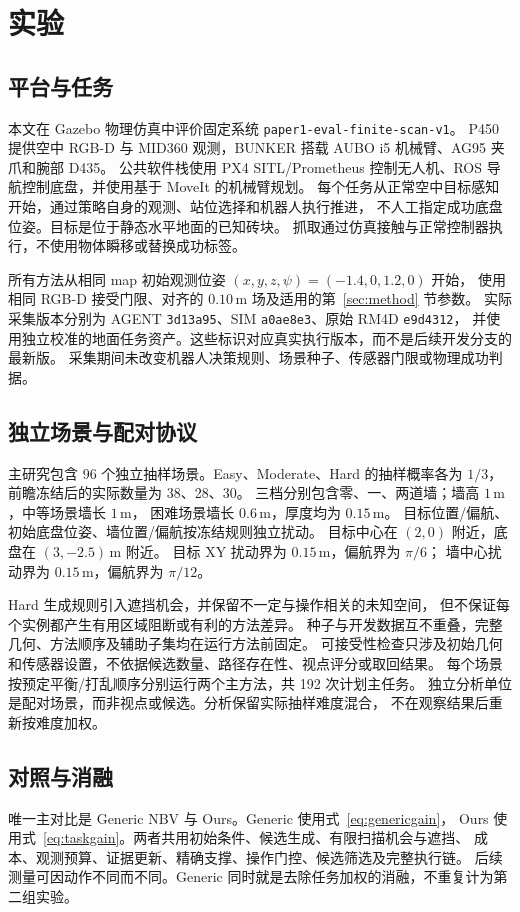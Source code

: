 \section{实验}
\label{sec:experiments}
\subsection{平台与任务}
本文在 Gazebo 物理仿真中评价固定系统 \texttt{paper1-eval-finite-scan-v1}。
P450 提供空中 RGB-D 与 MID360 观测，BUNKER 搭载 AUBO i5 机械臂、AG95 夹爪和腕部 D435。
公共软件栈使用 PX4 SITL/Prometheus 控制无人机、ROS 导航控制底盘，并使用基于 MoveIt 的机械臂规划。
每个任务从正常空中目标感知开始，通过策略自身的观测、站位选择和机器人执行推进，
不人工指定成功底盘位姿。目标是位于静态水平地面的已知砖块。
抓取通过仿真接触与正常控制器执行，不使用物体瞬移或替换成功标签。

所有方法从相同 map 初始观测位姿 $(x,y,z,\psi)=(-1.4,0,1.2,0)$ 开始，
使用相同 RGB-D 接受门限、对齐的 $0.10\,\mathrm{m}$ 场及适用的第~\ref{sec:method} 节参数。
实际采集版本分别为 AGENT \texttt{3d13a95}、SIM \texttt{a0ae8e3}、原始 RM4D \texttt{e9d4312}，
并使用独立校准的地面任务资产。这些标识对应真实执行版本，而不是后续开发分支的最新版。
采集期间未改变机器人决策规则、场景种子、传感器门限或物理成功判据。

\subsection{独立场景与配对协议}
\label{sec:scenes}
主研究包含 96 个独立抽样场景。Easy、Moderate、Hard 的抽样概率各为 $1/3$，
前瞻冻结后的实际数量为 38、28、30。
三档分别包含零、一、两道墙；墙高 $1\,\mathrm{m}$，中等场景墙长 $1\,\mathrm{m}$，
困难场景墙长 $0.6\,\mathrm{m}$，厚度均为 $0.15\,\mathrm{m}$。
目标位置/偏航、初始底盘位姿、墙位置/偏航按冻结规则独立扰动。
目标中心在 $(2,0)$ 附近，底盘在 $(3,-2.5)\,\mathrm{m}$ 附近。
目标 XY 扰动界为 $0.15\,\mathrm{m}$，偏航界为 $\pi/6$；
墙中心扰动界为 $0.15\,\mathrm{m}$，偏航界为 $\pi/12$。

Hard 生成规则引入遮挡机会，并保留不一定与操作相关的未知空间，
但不保证每个实例都产生有用区域阻断或有利的方法差异。
种子与开发数据互不重叠，完整几何、方法顺序及辅助子集均在运行方法前固定。
可接受性检查只涉及初始几何和传感器设置，不依据候选数量、路径存在性、视点评分或取回结果。
每个场景按预定平衡/打乱顺序分别运行两个主方法，共 192 次计划主任务。
独立分析单位是配对场景，而非视点或候选。分析保留实际抽样难度混合，
不在观察结果后重新按难度加权。

\subsection{对照与消融}
\label{sec:baselines}
唯一主对比是 Generic NBV 与 Ours。Generic 使用式~\eqref{eq:genericgain}，
Ours 使用式~\eqref{eq:taskgain}。两者共用初始条件、候选生成、有限扫描机会与遮挡、
成本、观测预算、证据更新、精确支撑、操作门控、候选筛选及完整执行链。
后续测量可因动作不同而不同。Generic 同时就是去除任务加权的消融，不重复计为第二组实验。

